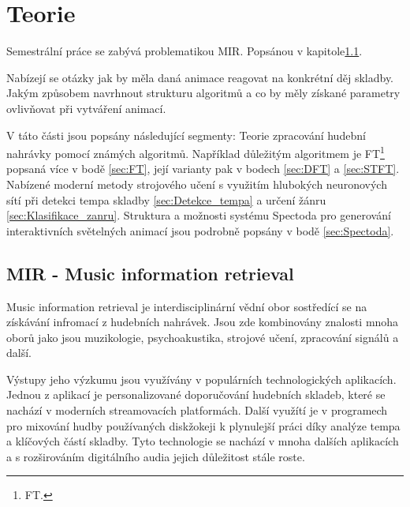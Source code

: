 \chapter{Teorie}

Semestrální práce se zabývá problematikou \acs{MIR}. Popsánou v kapitole\ref{sec:MIR}.


Nabízejí se otázky jak by měla daná animace reagovat na konkrétní děj skladby.
Jakým způsobem navrhnout strukturu algoritmů a co by měly získané parametry ovlivňovat při vytváření animací.


V táto části jsou popsány následující segmenty: Teorie zpracování hudební nahrávky pomocí známých algoritmů. Například důležitým algoritmem je \acs{FT}\footnote{\acl{FT}.}
popsaná více v bodě \ref{sec:FT}, její varianty pak v bodech \ref{sec:DFT} a \ref{sec:STFT}.
Nabízené moderní metody strojového učení s využitím hlubokých neuronových sítí při detekci tempa skladby \ref{sec:Detekce_tempa} a určení žánru \ref{sec:Klasifikace_zanru}.  
Struktura a možnosti systému Spectoda pro generování interaktivních světelných animací jsou podrobně popsány v bodě \ref{sec:Spectoda}.

\section{MIR - Music information retrieval} \label{sec:MIR}
    Music information retrieval je interdisciplinární vědní obor sostředící se na získávání infromací z hudebních nahrávek.
    Jsou zde kombinovány znalosti mnoha oborů jako jsou muzikologie, psychoakustika, strojové učení, zpracování signálů a další. 
    

    Výstupy jeho výzkumu jsou využívány v populárních technologických aplikacích. 
    Jednou z aplikací je personalizované doporučování hudebních skladeb, které se nachází v moderních streamovacích platformách.
    Další využítí je v programech pro mixování hudby používaných diskžokeji k plynulejší práci díky analýze tempa a klíčových částí skladby.
    Tyto technologie se nachází v mnoha dalších aplikacích a s rozširováním digitálního audia jejich důležitost stále roste.
    

